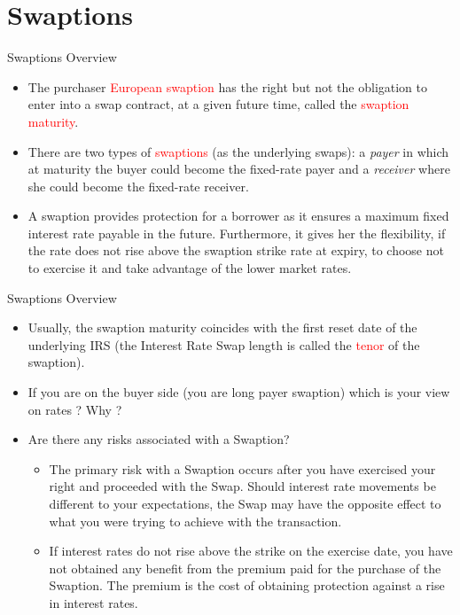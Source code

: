 \documentclass{beamer}
\begin{document}
\section{Swaptions}
\begin{frame}{Swaptions Overview}
\begin{itemize}
	\item<1-> The purchaser \textcolor{red}{European swaption} has the right but not the obligation to enter into a swap contract, at a given future time, called the \textcolor{red}{swaption maturity}.
	\item<2-> There are two types of \textcolor{red}{swaptions} (as the underlying swaps): a \emph{payer} in which at maturity the buyer could become the fixed-rate payer and a \emph{receiver} where she could become the fixed-rate receiver.
	\item<3-> A swaption provides protection for a borrower as it ensures a maximum fixed interest rate payable in the future. Furthermore, it gives her the flexibility, if the rate does not rise above the swaption strike rate at expiry, to choose not to exercise it and take advantage of the lower market rates.
\end{itemize}
\end{frame}

\begin{frame}{Swaptions Overview}
	\begin{itemize}
	\item<1-> Usually, the swaption maturity coincides with the first reset date of the underlying IRS (the Interest Rate Swap length is called the \textcolor{red}{tenor} of the swaption).	
	\item<2-> If you are on the buyer side (you are long payer swaption) which is your view on rates ? Why ?
	\item<3-> Are there any risks associated with a Swaption?
	\begin{itemize}
		\item<4-> The primary risk with a Swaption occurs after you have exercised your right and proceeded with the Swap. Should interest rate movements be different to your expectations, the Swap may have the opposite effect to what you were trying to achieve with the transaction. 
		\item<5-> If interest rates do not rise above the strike on the exercise date, you have not obtained any benefit from the premium paid for the purchase of the Swaption. The premium is the cost of obtaining protection against a rise in interest rates.
	\end{itemize}
\end{itemize}
\end{frame}
\end{document}
